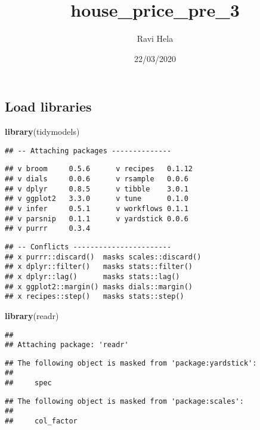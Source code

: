 \documentclass[
]{article}
\title{house\_price\_pre\_3}
\author{Ravi Hela}
\date{22/03/2020}
\newenvironment{Shaded}{\begin{snugshade}}{\end{snugshade}}
\newcommand{\KeywordTok}[1]{\textcolor[rgb]{0.13,0.29,0.53}{\textbf{#1}}}
\newcommand{\NormalTok}[1]{#1}
\begin{document}
\maketitle

\hypertarget{load-libraries}{%
\subsection{Load libraries}\label{load-libraries}}

\begin{Shaded}
\begin{Highlighting}[]
\KeywordTok{library}\NormalTok{(tidymodels)}
\end{Highlighting}
\end{Shaded}

\begin{verbatim}
## -- Attaching packages --------------
\end{verbatim}

\begin{verbatim}
## v broom     0.5.6      v recipes   0.1.12
## v dials     0.0.6      v rsample   0.0.6 
## v dplyr     0.8.5      v tibble    3.0.1 
## v ggplot2   3.3.0      v tune      0.1.0 
## v infer     0.5.1      v workflows 0.1.1 
## v parsnip   0.1.1      v yardstick 0.0.6 
## v purrr     0.3.4
\end{verbatim}

\begin{verbatim}
## -- Conflicts -----------------------
## x purrr::discard()  masks scales::discard()
## x dplyr::filter()   masks stats::filter()
## x dplyr::lag()      masks stats::lag()
## x ggplot2::margin() masks dials::margin()
## x recipes::step()   masks stats::step()
\end{verbatim}

\begin{Shaded}
\begin{Highlighting}[]
\KeywordTok{library}\NormalTok{(readr)}
\end{Highlighting}
\end{Shaded}

\begin{verbatim}
## 
## Attaching package: 'readr'
\end{verbatim}

\begin{verbatim}
## The following object is masked from 'package:yardstick':
## 
##     spec
\end{verbatim}

\begin{verbatim}
## The following object is masked from 'package:scales':
## 
##     col_factor
\end{verbatim}
\end{document}
